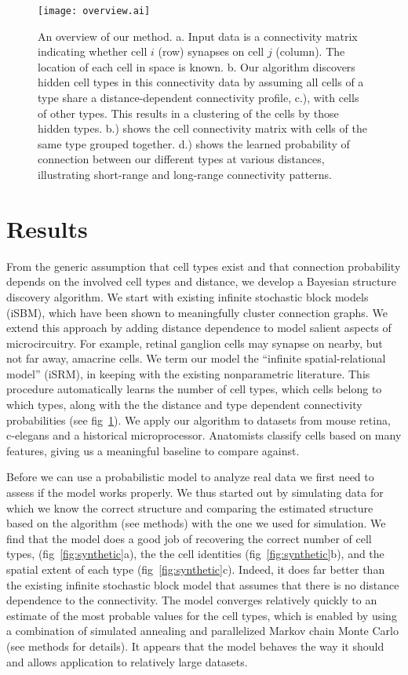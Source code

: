 \documentclass{article}
\begin{document}
\begin{figure}
  \centering 
  \centerline{\texttt{[image: overview.ai]}}
  \caption{An overview of our method. a. Input data is
a connectivity matrix indicating whether cell $i$ (row)
synapses on cell $j$ (column). The location of each cell in space is known. 
b. Our algorithm discovers hidden cell types in this connectivity data
by assuming all cells of a type share a distance-dependent connectivity 
profile, c.), with cells of other types. This results in a clustering 
of the cells by those hidden types. b.) shows the cell connectivity
matrix with cells of the same type grouped together. d.) shows
the learned probability of connection between our different types
at various distances, illustrating short-range and long-range
connectivity patterns.}
\label{fig:overview}
\end{figure}

\section{Results}
From the generic assumption that cell types exist and that connection probability depends on the involved cell types and distance, we develop a Bayesian structure discovery algorithm.
We start with existing infinite stochastic block models (iSBM)\autocite{Kemp2006a,Xu2006}, which have been shown to meaningfully cluster connection graphs. We extend this approach by adding distance dependence to model salient aspects of microcircuitry. For example, retinal ganglion cells may synapse on nearby, but not far away, amacrine cells.  We term our model the ``infinite spatial-relational model'' (iSRM), in keeping with the existing nonparametric literature. This procedure automatically learns the number of cell types, which cells belong to which types, along with the the distance and type dependent connectivity probabilities (see fig~\ref{fig:overview}). We apply our algorithm to datasets from mouse retina, c-elegans and a historical microprocessor. Anatomists classify cells based on many features, giving us a meaningful baseline to compare against.

Before we can use a probabilistic model to analyze real data we first
need to assess if the model works properly. We thus started out by
simulating data for which we know the correct structure and comparing
the estimated structure based on the algorithm (see methods) with the
one we used for simulation. We find that the model does a good job of
recovering the correct number of cell types,
(fig~\ref{fig:synthetic}a), the the cell identities
(fig~\ref{fig:synthetic}b), and the spatial extent of each type
(fig~\ref{fig:synthetic}c).  Indeed, it does far better than the
existing infinite stochastic block model that assumes that there is no
distance dependence to the connectivity. The model converges
relatively quickly to an estimate of the most probable values for the
cell types, which is enabled by using a combination of simulated
annealing and parallelized Markov chain Monte Carlo (see methods for
details). It appears that the model behaves the way it should and
allows application to relatively large datasets.
\end{document}
